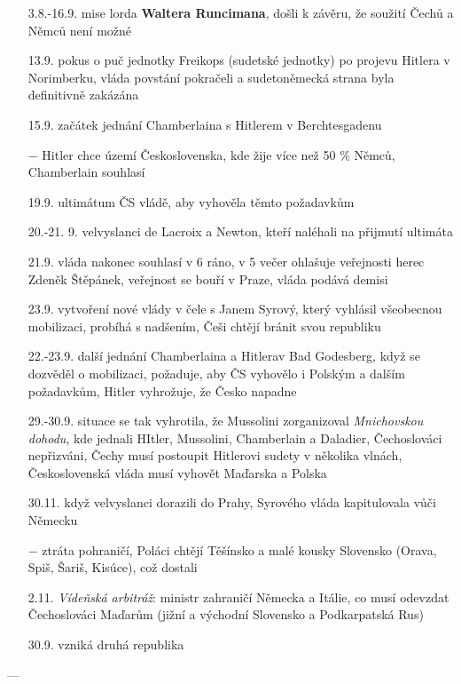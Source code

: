 \documentclass{article}
\begin{document}
\begin{itemize}
    \item[3.8.-16.9.] mise lorda \textbf{Waltera Runcimana}, došli k závěru, že soužití Čechů a Němců není možné
    \item[13.9.] pokus o puč jednotky Freikops (sudetské jednotky) po projevu Hitlera v Norimberku, vláda povstání pokračeli a sudetoněmecká strana byla definitivně zakázána
    \item[15.9.] začátek jednání Chamberlaina s Hitlerem v Berchtesgadenu
    \item[$-$] Hitler chce území Československa, kde žije více než 50 \% Němců, Chamberlain souhlasí
    \item[19.9.] ultimátum ČS vládě, aby vyhověla těmto požadavkům
    \item[20.-21. 9.] velvyslanci de Lacroix a Newton, kteří naléhali na přijmutí ultimáta
    \item[21.9.] vláda nakonec souhlasí v 6 ráno, v 5 večer ohlašuje veřejnosti herec Zdeněk Štěpánek, veřejnost se bouří v Praze, vláda podává demisi
    \item[23.9.] vytvoření nové vlády v čele s Janem Syrový, který vyhlásil všeobecnou mobilizaci, probíhá s nadšením, Češi chtějí bránit svou republiku
    \item[22.-23.9.] další jednání Chamberlaina a Hitlerav Bad Godesberg, když se dozvěděl o mobilizaci, požaduje, aby ČS vyhovělo i Polským a dalším požadavkům, Hitler  vyhrožuje, že Česko napadne
    \item[29.-30.9.] situace se tak vyhrotila, že Mussolini zorganizoval \textit{Mnichovskou dohodu}, kde jednali HItler, Mussolini, Chamberlain a Daladier, Čechoslováci nepřizváni, Čechy musí postoupit Hitlerovi sudety v několika vlnách, Československá vláda musí vyhovět Maďarska a Polska
    \item[30.11.] když velvyslanci dorazili do Prahy, Syrového vláda kapitulovala vůči Německu
    \item[$-$] ztráta pohraničí, Poláci chtějí Těšínsko a malé kousky Slovensko (Orava, Spiš, Šariš, Kisúce), což dostali
    \item[2.11.] \textit{Vídeňská arbitráž}: ministr zahraničí Německa a Itálie, co musí odevzdat Čechoslováci Maďarům (jižní a východní Slovensko a Podkarpatská Rus)
    \item[30.9.]  vzniká druhá republika
\end{itemize}

---
\end{document}
